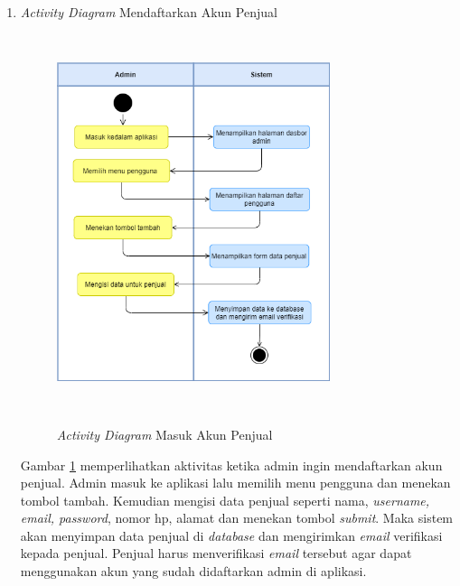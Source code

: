 \begin{enumerate}
	\item \textit{Activity Diagram} Mendaftarkan Akun Penjual
	\begin{figure}[H]
		\centering
		{\includegraphics [width = 8cm, height= 11cm]{gambar/activity diagram/daftar akun penjual}}
		\caption{\textit{Activity Diagram} Masuk Akun Penjual}
		\label{daftar akun penjual}
	\end{figure}
	\par Gambar \ref*{daftar akun penjual} memperlihatkan aktivitas ketika admin ingin mendaftarkan akun penjual.
	Admin masuk ke aplikasi lalu memilih menu pengguna dan menekan tombol tambah. Kemudian mengisi data penjual seperti nama, \textit{username, email, password}, nomor hp, alamat dan menekan tombol \textit{submit}. Maka sistem akan menyimpan data penjual di \textit{database} dan mengirimkan \textit{email} verifikasi kepada penjual. Penjual harus menverifikasi \textit{email} tersebut agar dapat menggunakan akun yang sudah didaftarkan admin di aplikasi.


\end{enumerate}
